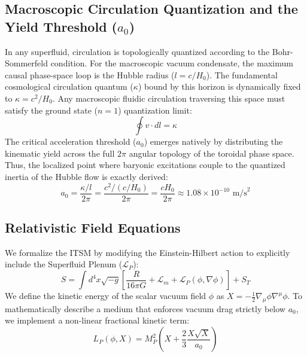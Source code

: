 \documentclass[aps,prd,onecolumn,linenumbers,superscriptaddress,nofootinbib]{revtex4-2}
\begin{document}
\subsection{Macroscopic Circulation Quantization and the Yield Threshold ($a_0$)}
In any superfluid, circulation is topologically quantized according to the Bohr-Sommerfeld condition. For the macroscopic vacuum condensate, the maximum causal phase-space loop is the Hubble radius ($l = c/H_0$). The fundamental cosmological circulation quantum ($\kappa$) bound by this horizon is dynamically fixed to $\kappa = c^2/H_0$. Any macroscopic fluidic circulation traversing this space must satisfy the ground state ($n=1$) quantization limit:
\begin{equation}
\oint v \cdot dl = \kappa
\end{equation}
The critical acceleration threshold ($a_0$) emerges natively by distributing the kinematic yield across the full $2\pi$ angular topology of the toroidal phase space. Thus, the localized point where baryonic excitations couple to the quantized inertia of the Hubble flow is exactly derived:
\begin{equation}
a_0 = \frac{\kappa/l}{2\pi} = \frac{c^2/(c/H_0)}{2\pi} = \frac{c H_0}{2\pi} \approx 1.08 \times 10^{-10} \text{ m/s}^2
\end{equation}

\subsection{Relativistic Field Equations}
We formalize the ITSM by modifying the Einstein-Hilbert action to explicitly include the Superfluid Plenum ($\mathcal{L}_P$):
\begin{equation}
S = \int d^4x \sqrt{-g} \left[ \frac{R}{16\pi G} + \mathcal{L}_m + \mathcal{L}_P(\phi, \nabla\phi) \right] + S_T
\end{equation}
We define the kinetic energy of the scalar vacuum field $\phi$ as $X = -\frac{1}{2}\nabla_\mu\phi\nabla^\mu\phi$. To mathematically describe a medium that enforces vacuum drag strictly below $a_0$, we implement a non-linear fractional kinetic term:
\begin{equation}
L_P(\phi, X) = M_P^2 \left(X + \frac{2}{3}\frac{X\sqrt{X}}{a_0}\right)
\end{equation}
\end{document}
